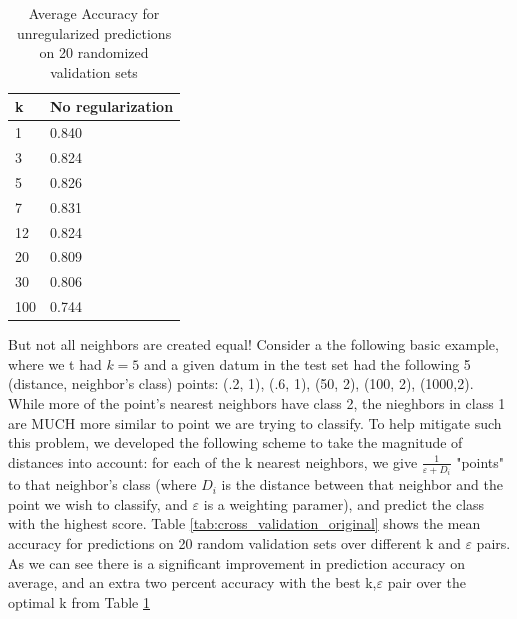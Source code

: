 \documentclass[letterpaper]{article}
\begin{document}
\begin{table}[h!]
\centering
\begin{tabular}{l|l}
k   & No regularization \\\hline\hline
1   & 0.840             \\
3   & 0.824             \\
5   & 0.826             \\
7   & 0.831             \\
12  & 0.824             \\
20  & 0.809             \\
30  & 0.806             \\
100 & 0.744            
\end{tabular}
\caption{Average Accuracy for unregularized predictions on 20 randomized validation sets}
\label{tab:knn_no_reg}
\end{table}
\noindent
But not all neighbors are created equal! Consider a the following basic example, where we t had $k=5$ and a given datum in the test set had the following 5 (distance, neighbor's class) points: (.2, 1), (.6, 1), (50, 2), (100, 2), (1000,2). While more of the point's nearest neighbors have class 2, the nieghbors in class 1 are MUCH more similar to point we are trying to classify. To help mitigate such this problem, we developed the following scheme to take the magnitude of distances into account: for each of the k nearest neighbors, we give $\frac{1}{\varepsilon + D_i}$ "points" to that neighbor's class (where $D_i$ is the distance between that neighbor and the point we wish to classify, and $\varepsilon$ is a weighting paramer), and predict the class with the highest score. Table \ref{tab:cross_validation_original} shows the mean accuracy for predictions on 20 random validation sets over different k and $\varepsilon$ pairs. As we can see there is a significant improvement in prediction accuracy on average, and an extra two percent accuracy with the best k,$\varepsilon$ pair over the optimal k from Table \ref{tab:knn_no_reg}\\\\
\noindent
\end{document}
